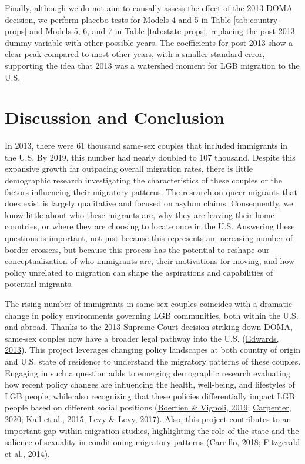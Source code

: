 \documentclass[
  12pt,
]{article}
\begin{document}
Finally, although we do not aim to causally assess the effect of the 2013 DOMA decision, we perform placebo tests for Models 4 and 5 in Table \ref{tab:country-props} and Models 5, 6, and 7 in Table \ref{tab:state-props}, replacing the post-2013 dummy variable with other possible years. The coefficients for post-2013 show a clear peak compared to most other years, with a smaller standard error, supporting the idea that 2013 was a watershed moment for LGB migration to the U.S.

\hypertarget{discussion-and-conclusion}{%
\section{Discussion and Conclusion}\label{discussion-and-conclusion}}

In 2013, there were 61 thousand same-sex couples that included immigrants in the U.S. By 2019, this number had nearly doubled to 107 thousand. Despite this expansive growth far outpacing overall migration rates, there is little demographic research investigating the characteristics of these couples or the factors influencing their migratory patterns. The research on queer migrants that does exist is largely qualitative and focused on asylum claims. Consequently, we know little about who these migrants are, why they are leaving their home countries, or where they are choosing to locate once in the U.S. Answering these questions is important, not just because this represents an increasing number of border crossers, but because this process has the potential to reshape our conceptualization of who immigrants are, their motivations for moving, and how policy unrelated to migration can shape the aspirations and capabilities of potential migrants.

The rising number of immigrants in same-sex couples coincides with a dramatic change in policy environments governing LGB communities, both within the U.S. and abroad. Thanks to the 2013 Supreme Court decision striking down DOMA, same-sex couples now have a broader legal pathway into the U.S. (\protect\hyperlink{ref-edwards_2013}{Edwards, 2013}). This project leverages changing policy landscapes at both country of origin and U.S. state of residence to understand the migratory patterns of these couples. Engaging in such a question adds to emerging demographic research evaluating how recent policy changes are influencing the health, well-being, and lifestyles of LGB people, while also recognizing that these policies differentially impact LGB people based on different social positions (\protect\hyperlink{ref-boertien_2019}{Boertien \& Vignoli, 2019}; \protect\hyperlink{ref-carpenter_2020}{Carpenter, 2020}; \protect\hyperlink{ref-kail_2015}{Kail et al., 2015}; \protect\hyperlink{ref-levy_2017}{Levy \& Levy, 2017}). Also, this project contributes to an important gap within migration studies, highlighting the role of the state and the salience of sexuality in conditioning migratory patterns (\protect\hyperlink{ref-carrillo_2018}{Carrillo, 2018}; \protect\hyperlink{ref-fitzgerald_2014}{Fitzgerald et al., 2014}).
\end{document}
